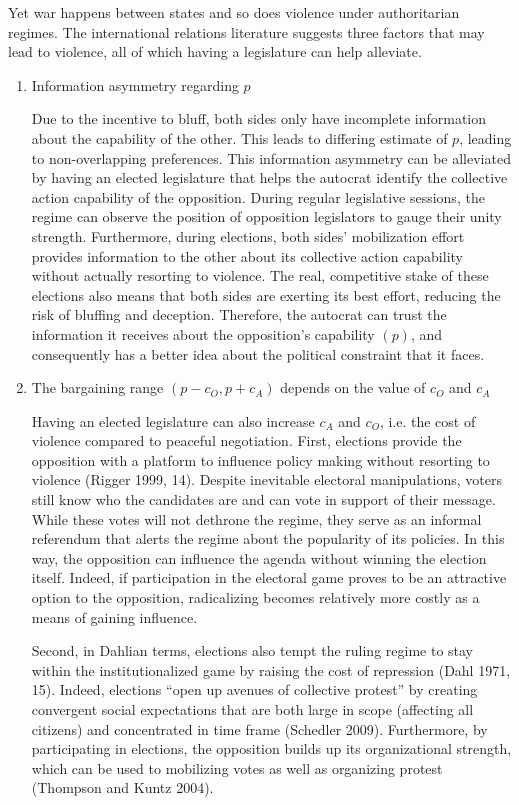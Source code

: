 Yet war happens between states and so does violence under authoritarian regimes. The international relations literature suggests three factors that may lead to violence, all of which having a legislature can help alleviate.

\begin{enumerate}
\item Information asymmetry regarding $p$

Due to the incentive to bluff, both sides only have incomplete information about the capability of the other. This leads to differing estimate of $p$, leading to non-overlapping preferences. This information asymmetry can be alleviated by having an elected legislature that helps the autocrat identify the collective action capability of the opposition. During regular legislative sessions, the regime can observe the position of opposition legislators to gauge their unity strength. Furthermore, during elections, both sides’ mobilization effort provides information to the other about its collective action capability without actually resorting to violence. The real, competitive stake of these elections also means that both sides are exerting its best effort, reducing the risk of bluffing and deception. Therefore, the autocrat can trust the information it receives about the opposition’s capability $(p)$, and consequently has a better idea about the political constraint that it faces.

\item The bargaining range $(p - c_O, p + c_A)$ depends on the value of $c_O$ and $c_A$

Having an elected legislature can also increase $c_A$ and $c_O$, i.e. the cost of violence compared to peaceful negotiation. First, elections provide the opposition with a platform to influence policy making without resorting to violence (Rigger 1999, 14). Despite inevitable electoral manipulations, voters still know who the candidates are and can vote in support of their message. While these votes will not dethrone the regime, they serve as an informal referendum that alerts the regime about the popularity of its policies. In this way, the opposition can influence the agenda without winning the election itself. Indeed, if participation in the electoral game proves to be an attractive option to the opposition, radicalizing becomes relatively more costly as a means of gaining influence.

Second, in Dahlian terms, elections also tempt the ruling regime to stay within the institutionalized game by raising the cost of repression (Dahl 1971, 15). Indeed, elections “open up avenues of collective protest” by creating convergent social expectations that are both large in scope (affecting all citizens) and concentrated in time frame (Schedler 2009). Furthermore, by participating in elections, the opposition builds up its organizational strength, which can be used to mobilizing votes as well as organizing protest (Thompson and Kuntz 2004).


\end{enumerate}
